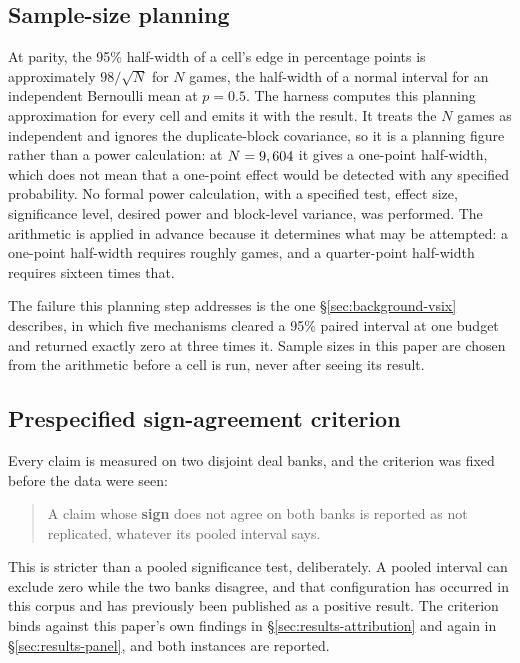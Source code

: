 \subsection{Sample-size planning}
\label{sec:evaluation-power}

At parity, the 95\% half-width of a cell's edge in percentage points is approximately
$98/\sqrt{N}$ for $N$ games, the half-width of a normal interval for an independent Bernoulli mean
at $p = 0.5$. The harness computes this planning approximation for every cell and emits it with the
result. It treats the $N$ games as independent and ignores the duplicate-block covariance, so it is a
planning figure rather than a power calculation: at $N = 9,604{}$ it gives a
one-point half-width, which does not mean that a one-point effect would be detected with any
specified probability. No formal power calculation, with a specified test, effect size, significance
level, desired power and block-level variance, was performed. The arithmetic is applied in advance
because it determines what may be attempted: a one-point half-width requires roughly
\vsevenScoreboardGames{} games, and a quarter-point half-width requires sixteen times that.

The failure this planning step addresses is the one \S\ref{sec:background-vsix} describes, in which
five mechanisms cleared a 95\% paired interval at one budget and returned exactly zero at three
times it. Sample sizes in this paper are chosen from the arithmetic before a cell is run, never
after seeing its result.

\subsection{Prespecified sign-agreement criterion}
\label{sec:evaluation-replication}

Every claim is measured on two disjoint deal banks, and the criterion was fixed before the data were
seen:

\begin{quote}
A claim whose \textbf{sign} does not agree on both banks is reported as not replicated, whatever its
pooled interval says.
\end{quote}

This is stricter than a pooled significance test, deliberately. A pooled interval can exclude zero
while the two banks disagree, and that configuration has occurred in this corpus and has previously
been published as a positive result. The criterion binds against this paper's own findings in
\S\ref{sec:results-attribution} and again in \S\ref{sec:results-panel}, and both instances are
reported.


